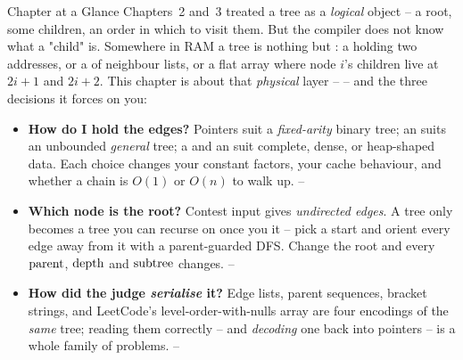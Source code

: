 
\begin{chaptertheorybox}{Chapter at a Glance}
Chapters~2 and~3 treated a tree as a \emph{logical} object -- a root, some
children, an order in which to visit them. But the compiler does not know what a
"child" is. Somewhere in RAM a tree is nothing but : a
 holding two addresses, or a  of neighbour
lists, or a flat array where node $i$'s children live at $2i+1$ and
$2i+2$. This chapter is about that \emph{physical} layer --  --
and the three decisions it forces on you:

\begin{itemize}[nosep]
  \item \textbf{How do I hold the edges?} Pointers suit a \emph{fixed-arity} binary
        tree; an  suits an unbounded \emph{general} tree; a
         and an  suit complete, dense,
        or heap-shaped data. Each choice changes your constant factors, your cache
        behaviour, and whether a chain is $O(1)$ or $O(n)$ to walk up.  \hfill {}--
  \item \textbf{Which node is the root?} Contest input gives \emph{undirected edges}.
        A tree only becomes a tree you can recurse on once you  it -- pick
        a start and orient every edge away from it with a parent-guarded DFS. Change
        the root and every $\operatorname{parent}$, $\operatorname{depth}$ and $\operatorname{subtree}$ changes.   \hfill {}--
  \item \textbf{How did the judge \emph{serialise} it?} Edge lists, parent sequences,
        bracket strings, and LeetCode's level-order-with-nulls array are
        four encodings of the \emph{same} tree; reading them correctly -- and
        \emph{decoding} one back into pointers -- is a whole family of problems. \hfill {}--
\end{itemize}


\end{chaptertheorybox}
